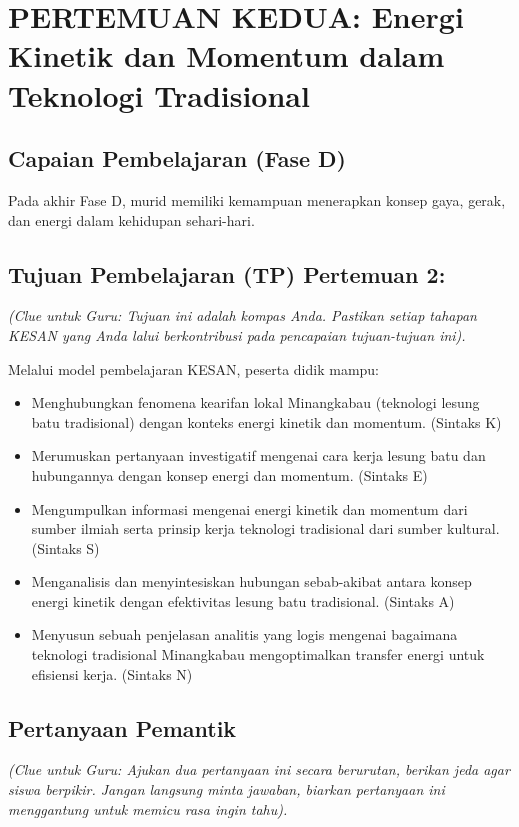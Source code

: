 \documentclass[a4paper,12pt]{article}
\begin{document}
\section{PERTEMUAN KEDUA: Energi Kinetik dan Momentum dalam Teknologi Tradisional}

\subsection{Capaian Pembelajaran (Fase D)}
Pada akhir Fase D, murid memiliki kemampuan menerapkan konsep gaya, gerak, dan energi dalam kehidupan sehari-hari.

\subsection{Tujuan Pembelajaran (TP) Pertemuan 2:}
\textit{(Clue untuk Guru: Tujuan ini adalah kompas Anda. Pastikan setiap tahapan KESAN yang Anda lalui berkontribusi pada pencapaian tujuan-tujuan ini).}

Melalui model pembelajaran KESAN, peserta didik mampu:
\begin{itemize}
\item Menghubungkan fenomena kearifan lokal Minangkabau (teknologi lesung batu tradisional) dengan konteks energi kinetik dan momentum. (Sintaks K)
\item Merumuskan pertanyaan investigatif mengenai cara kerja lesung batu dan hubungannya dengan konsep energi dan momentum. (Sintaks E)
\item Mengumpulkan informasi mengenai energi kinetik dan momentum dari sumber ilmiah serta prinsip kerja teknologi tradisional dari sumber kultural. (Sintaks S)
\item Menganalisis dan menyintesiskan hubungan sebab-akibat antara konsep energi kinetik dengan efektivitas lesung batu tradisional. (Sintaks A)
\item Menyusun sebuah penjelasan analitis yang logis mengenai bagaimana teknologi tradisional Minangkabau mengoptimalkan transfer energi untuk efisiensi kerja. (Sintaks N)
\end{itemize}

\subsection{Pertanyaan Pemantik}
\textit{(Clue untuk Guru: Ajukan dua pertanyaan ini secara berurutan, berikan jeda agar siswa berpikir. Jangan langsung minta jawaban, biarkan pertanyaan ini menggantung untuk memicu rasa ingin tahu).}
\end{document}
